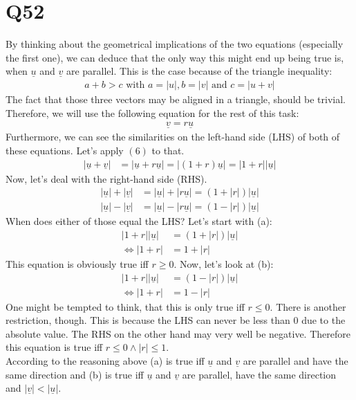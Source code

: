 \documentclass{article}
\renewcommand{\vec}{\underline}
\begin{document}
\section*{Q52}
By thinking about the geometrical implications of the two equations (especially the first one), we can deduce that the only way this might end up being true is, when $\vec u$ and $\vec v$ are parallel. This is the case because of the triangle inequality:
\begin{align}
    a + b > c \text{ with } a = |u|, b = |v| \text{ and } c = |u+v|
\end{align}
The fact that those three vectors may be aligned in a triangle, should be trivial.\\
Therefore, we will use the following equation for the rest of this task:
\begin{align}
    \vec v = r \vec u
\end{align}
Furthermore, we can see the similarities on the left-hand side (LHS) of both of these equations. Let's apply $(6)$ to that.
\begin{align}
    |\vec u + \vec v| &= |\vec u + r \vec u| = |(1+r)\vec u|=|1+r||\vec u|
\end{align}
Now, let's deal with the right-hand side (RHS).
\begin{align}
    |\vec u| + |\vec v| &= |\vec u| + |r \vec u| = (1 + |r|)|\vec u|\\
    |\vec u| - |\vec v| &= |\vec u| - |r \vec u| = (1 - |r|)|\vec u|
\end{align}
When does either of those equal the LHS? Let's start with (a):
\begin{align}
    |1 + r||\vec u| &= (1 + |r|)|\vec u|\\
    \Leftrightarrow|1+r| &=1+|r|
\end{align}
This equation is obviously true iff $r \geq 0$. Now, let's look at (b):
\begin{align}
    |1 + r||\vec u| &= (1 - |r|)|\vec u|\\
    \Leftrightarrow|1+r| &=1-|r|
\end{align}
One might be tempted to think, that this is only true iff $r \leq 0$. There is another restriction, though. This is because the LHS can never be less than $0$ due to the absolute value. The RHS on the other hand may very well be negative. Therefore this equation is true iff $r \leq 0 \wedge |r| \leq 1$.\\
According to the reasoning above (a) is true iff $\vec u$ and $\vec v$ are parallel and have the same direction and (b) is true iff $\vec u$ and $\vec v$ are parallel, have the same direction and $|\vec v| < |\vec u|$.
\end{document}
